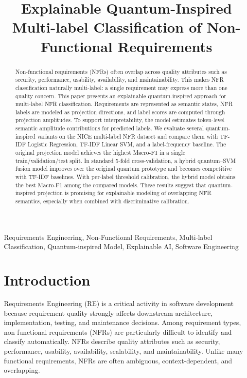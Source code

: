 \documentclass[conference]{IEEEtran}
\title{Explainable Quantum-Inspired Multi-label Classification of Non-Functional Requirements}
\author{
\IEEEauthorblockN{Student Research Project}
\IEEEauthorblockA{FPT University\\
Ho Chi Minh City, Vietnam\\
Email: student@example.com}
}
\begin{document}
\maketitle

\begin{abstract}
Non-functional requirements (NFRs) often overlap across quality attributes such as security, performance, usability, availability, and maintainability. This makes NFR classification naturally multi-label: a single requirement may express more than one quality concern. This paper presents an explainable quantum-inspired approach for multi-label NFR classification. Requirements are represented as semantic states, NFR labels are modeled as projection directions, and label scores are computed through projection amplitudes. To support interpretability, the model estimates token-level semantic amplitude contributions for predicted labels. We evaluate several quantum-inspired variants on the NICE multi-label NFR dataset and compare them with TF-IDF Logistic Regression, TF-IDF Linear SVM, and a label-frequency baseline. The original projection model achieves the highest Macro-F1 in a single train/validation/test split. In standard 5-fold cross-validation, a hybrid quantum--SVM fusion model improves over the original quantum prototype and becomes competitive with TF-IDF baselines. With per-label threshold calibration, the hybrid model obtains the best Macro-F1 among the compared models. These results suggest that quantum-inspired projection is promising for explainable modeling of overlapping NFR semantics, especially when combined with discriminative calibration.
\end{abstract}

\begin{IEEEkeywords}
Requirements Engineering, Non-Functional Requirements, Multi-label Classification, Quantum-inspired Model, Explainable AI, Software Engineering
\end{IEEEkeywords}

\section{Introduction}
Requirements Engineering (RE) is a critical activity in software development because requirement quality strongly affects downstream architecture, implementation, testing, and maintenance decisions. Among requirement types, non-functional requirements (NFRs) are particularly difficult to identify and classify automatically. NFRs describe quality attributes such as security, performance, usability, availability, scalability, and maintainability. Unlike many functional requirements, NFRs are often ambiguous, context-dependent, and overlapping.
\end{document}

